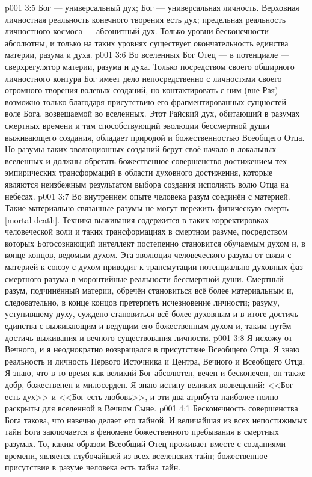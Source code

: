 \vs p001 3:5 \pc Бог --- универсальный дух; Бог --- универсальная личность. Верховная личностная реальность конечного творения есть дух; предельная реальность личностного космоса --- абсонитный дух. Только уровни бесконечности абсолютны, и только на таких уровнях существует окончательность единства материи, разума и духа.
\vs p001 3:6 \pc Во вселенных Бог Отец --- в потенциале --- сверхрегулятор материи, разума и духа. Только посредством своего обширного личностного контура Бог имеет дело непосредственно с личностями своего огромного творения волевых созданий, но контактировать с ним (вне Рая) возможно только благодаря присутствию его фрагментированных сущностей --- воле Бога, возвещаемой во вселенных. Этот Райский дух, обитающий в разумах смертных времени и там способствующий эволюции бессмертной души выживающего создания, обладает природой и божественностью Всеобщего Отца. Но разумы таких эволюционных созданий берут своё начало в локальных вселенных и должны обретать божественное совершенство достижением тех эмпирических трансформаций в области духовного достижения, которые являются неизбежным результатом выбора создания исполнять волю Отца на небесах.
\vs p001 3:7 \pc Во внутреннем опыте человека разум соединён с материей. Такие материально\hyp{}связанные разумы не могут пережить физическую смерть [mortal death]. Техника выживания содержится в таких корректировках человеческой воли и таких трансформациях в смертном разуме, посредством которых Богосознающий интеллект постепенно становится обучаемым духом и, в конце концов, ведомым духом. Эта эволюция человеческого разума от связи с материей к союзу с духом приводит к трансмутации потенциально духовных фаз смертного разума в моронтийные реальности бессмертной души. Смертный разум, подчинённый материи, обречён становиться всё более материальным и, следовательно, в конце концов претерпеть исчезновение личности; разуму, уступившему духу, суждено становиться всё более духовным и в итоге достичь единства с выживающим и ведущим его божественным духом и, таким путём достичь выживания и вечного существования личности.
\vs p001 3:8 Я исхожу от Вечного, и я неоднократно возвращался в присутствие Всеобщего Отца. Я знаю реальность и личность Первого Источника и Центра, Вечного и Всеобщего Отца. Я знаю, что в то время как великий Бог абсолютен, вечен и бесконечен, он также добр, божественен и милосерден. Я знаю истину великих возвещений: <<Бог есть дух>> и <<Бог есть любовь>>, и эти два атрибута наиболее полно раскрыты для вселенной в Вечном Сыне.
\vs p001 4:1 Бесконечность совершенства Бога такова, что навечно делает его тайной. И величайшая из всех непостижимых тайн Бога заключается в феномене божественного пребывания в смертных разумах. То, каким образом Всеобщий Отец проживает вместе с созданиями времени, является глубочайшей из всех вселенских тайн; божественное присутствие в разуме человека есть тайна тайн.
